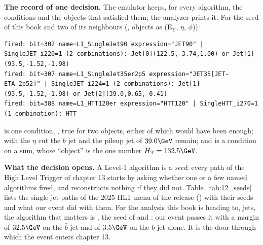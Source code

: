 \textbf{The record of one decision.} The emulator keeps, for every algorithm, the conditions and the objects that
satisfied them; the analyzer prints it. For the seed of this book and two of its neighbours
(, objects as (E$_{\mathrm T}$, $\eta$, $\phi$)):

\begin{lstlisting}[style=txt]
fired: bit=302 name=L1_SingleJet90 expression="JET90" | SingleJET_i220=1 (2 combinations): Jet[0](122.5,-3.74,1.00) or Jet[1](93.5,-1.52,-1.98)
fired: bit=307 name=L1_SingleJet35er2p5 expression="JET35[JET-ETA_2p52]" | SingleJET_i224=1 (2 combinations): Jet[1](93.5,-1.52,-1.98) or Jet[2](39.0,0.65,-0.41)
fired: bit=388 name=L1_HTT120er expression="HTT120" | SingleHTT_i270=1 (1 combination): HTT
\end{lstlisting}

\noindent {} is one condition, , true for two objects, either of which would have
been enough; with the $\eta$ cut the $b$ jet and the pileup jet of $39.0\GeV$ remain; and  is a
condition on a sum, whose ``object'' is the one number $H_{\mathrm T}=132.5\GeV$.

\textbf{What the decision opens.} A Level-1 algorithm is a \emph{seed}: every path of the High Level Trigger of
chapter 13 starts by asking whether one or a few named algorithms fired, and reconstructs nothing if they did not.
Table~\ref{tab:12_seeds} lists the single-jet paths of the 2025 HLT menu of the release
() with their seeds and what our event did with them. For the
analysis this book is heading to, jets, the algorithm that matters is , the seed of
 and : our event passes it with a margin of $32.5\GeV$ on the $\bar b$ jet and
of $3.5\GeV$ on the $b$ jet alone. It is the door through which the event enters chapter 13.


